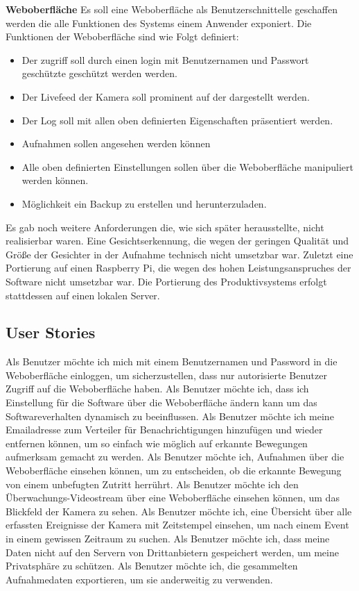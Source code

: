 \textbf{Weboberfläche}\newline
Es soll eine Weboberfläche als Benutzerschnittelle geschaffen werden die alle Funktionen des Systems einem Anwender exponiert.
Die Funktionen der Weboberfläche sind wie Folgt definiert:
\begin{itemize}
\item Der zugriff soll durch einen login mit Benutzernamen und Passwort geschützte geschützt werden werden.
\item Der Livefeed der Kamera soll prominent auf der dargestellt werden.
\item Der Log soll mit allen oben definierten Eigenschaften präsentiert werden.
\item Aufnahmen sollen angesehen werden können
\item Alle oben definierten Einstellungen sollen über die Weboberfläche manipuliert werden können.
\item Möglichkeit ein Backup zu erstellen und herunterzuladen.
\end{itemize}
Es gab noch weitere Anforderungen die, wie sich später herausstellte, nicht realisierbar waren. Eine Gesichtserkennung, die wegen der geringen Qualität und Größe der Gesichter in der Aufnahme technisch nicht umsetzbar war.  Zuletzt eine Portierung auf einen Raspberry Pi, die wegen des hohen Leistungsanspruches der Software nicht umsetzbar war. Die Portierung des Produktivsystems erfolgt stattdessen auf einen lokalen Server.
 
\subsection{User Stories}
Als Benutzer möchte ich mich mit einem Benutzernamen und Password in die Weboberfläche einloggen, um sicherzustellen, dass nur autorisierte Benutzer Zugriff auf die Weboberfläche haben.
\newline
Als Benutzer möchte ich, dass ich Einstellung für die Software über die Weboberfläche ändern kann um das Softwareverhalten dynamisch zu beeinflussen.
\newline
Als Benutzer möchte ich meine Emailadresse zum Verteiler für Benachrichtigungen hinzufügen und wieder entfernen können, um so einfach wie möglich auf erkannte Bewegungen aufmerksam gemacht zu werden.
\newline
Als Benutzer möchte ich, Aufnahmen über die Weboberfläche einsehen können, um zu entscheiden, ob die erkannte Bewegung von einem unbefugten Zutritt herrührt.
\newline
Als Benutzer möchte ich den Überwachungs-Videostream über eine Weboberfläche einsehen können, um das Blickfeld der Kamera zu sehen.
\newline
Als Benutzer möchte ich, eine Übersicht über alle erfassten Ereignisse der Kamera mit Zeitstempel einsehen, um nach einem Event in einem gewissen Zeitraum zu suchen.
\newline
Als Benutzer möchte ich, dass meine Daten nicht auf den Servern von Drittanbietern gespeichert werden, um meine Privatsphäre zu schützen.
\newline
Als Benutzer möchte ich, die gesammelten Aufnahmedaten exportieren, um sie anderweitig zu verwenden.


